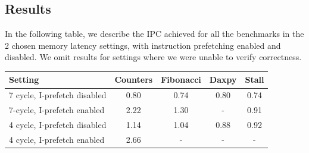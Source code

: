 \documentclass{article}
\begin{document}
\subsection{Results}
\label{sub:results}

In the following table, we describe the IPC achieved for all the benchmarks in
the 2 chosen memory latency settings, with instruction prefetching enabled and
disabled. We omit results for settings where we were unable to verify
correctness.

\begin{center}
    \begin{tabular}{|l|c|c|c|c|}
    \hline
    Setting & Counters & Fibonacci & Daxpy & Stall \\ \hline
    7 cycle, I-prefetch disabled & 0.80 & 0.74 & 0.80 & 0.74 \\ \hline
    7-cycle, I-prefetch enabled & 2.22 & 1.30 & - & 0.91 \\ \hline
    4 cycle, I-prefetch disabled & 1.14 & 1.04 & 0.88 & 0.92 \\ \hline
    4 cycle, I-prefetch enabled & 2.66 & - & - & - \\
    \hline
    \end{tabular}
\end{center}
\end{document}
